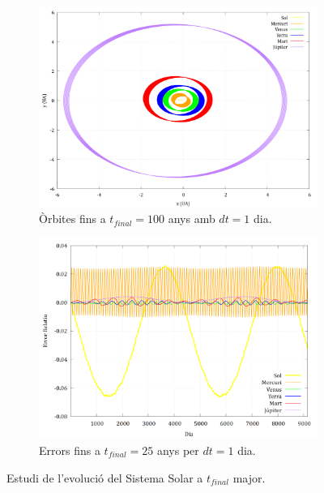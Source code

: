 \documentclass[10pt, twoside, a4paper]{article}
\begin{document}
\begin{figure}[h!]
    \centering
    \begin{subfigure}[b]{0.48\linewidth}
        \centering
        \includegraphics[width=\linewidth]{../sist_solar/orbites_euler_100_d1dia.png}
        \caption{Òrbites fins a $t_{final}=100$ anys amb $dt=1$ dia.}
    \end{subfigure}
    \hfill
    \begin{subfigure}[b]{0.48\linewidth}
        \centering
        \includegraphics[width=\linewidth]{../Error/error_100_dia.png}
        \caption{Errors fins a $t_{final}=25$ anys per $dt=1$ dia.}
    \end{subfigure}
    \caption{Estudi de l'evolució del Sistema Solar a $t_{final}$ major.}
    \label{fig4}
\end{figure}
\end{document}
